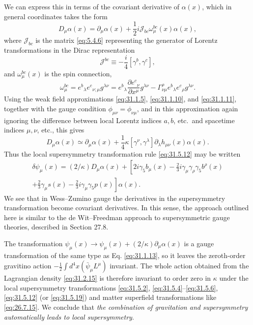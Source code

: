 We can express this in terms of the covariant derivative of \(\alpha(x)\),
which in general coordinates takes the form
\begin{equation}
  D_\mu\alpha(x)
  =\partial_\mu\alpha(x)
   +\frac{1}{2}i\mathscr{J}_{bc}\omega_\mu^{bc}(x)\alpha(x),
  \tag{31.5.15}\label{eq:31.5.15}
\end{equation}
where \(\mathscr{J}_{bc}\) is the matrix \eqref{eq:5.4.6} representing
the generator of Lorentz transformations in the Dirac representation
\begin{equation}
  \mathscr{J}^{bc}
  \equiv-\frac{i}{4}[\gamma^b,\gamma^c],
  \tag{31.5.16}\label{eq:31.5.16}
\end{equation}
and \(\omega_\mu^{bc}(x)\) is the spin connection,
\begin{equation}
  \omega_\mu^{bc}
  =e^b{}_\lambda e^c{}_{\nu;\mu}g^{\lambda\nu}
  =e^b{}_\lambda\frac{\partial e^c{}_\nu}{\partial x^\mu}g^{\lambda\nu}
   -\Gamma^\rho_{\nu\mu}e^b{}_\lambda e^c{}_\rho g^{\lambda\nu}.
  \tag{31.5.17}\label{eq:31.5.17}
\end{equation}
Using the weak field approximations \eqref{eq:31.1.5},
\eqref{eq:31.1.10}, and \eqref{eq:31.1.11}, together with the gauge
condition \(\phi_{\mu\nu}=\phi_{\nu\mu}\), and in this approximation
again ignoring the difference between local Lorentz indices \(a,b\),
etc.\ and spacetime indices \(\mu,\nu\), etc., this gives
\begin{equation}
  D_\mu\alpha(x)
  \simeq\partial_\mu\alpha(x)
  +\frac{1}{4}\kappa[\gamma^\nu,\gamma^\lambda]
    \partial_\lambda h_{\mu\nu}(x)\alpha(x).
  \tag{31.5.18}\label{eq:31.5.18}
\end{equation}
Thus the local supersymmetry transformation rule \eqref{eq:31.5.12} may
be written
\begin{multline}
  \delta\psi_\mu(x)
  =(2/\kappa)D_\mu\alpha(x)
  +\left[
      2i\gamma_5b_\mu(x)
      -\frac{2}{3}i\gamma_\mu\gamma_\rho\gamma_5b^\rho(x)\right.\\
  \left.
      +\frac{2}{3}\gamma_\mu s(x)
      -\frac{2}{3}i\gamma_\mu\gamma_5p(x)
    \right]\alpha(x).
  \tag{31.5.19}\label{eq:31.5.19}
\end{multline}
We see that in Wess--Zumino gauge the derivatives in the supersymmetry
transformation become covariant derivatives. In this sense, the
approach outlined here is similar to the de Wit--Freedman approach to
supersymmetric gauge theories, described in Section 27.8.

The transformation
\(\psi_\mu(x)\longrightarrow\psi_\mu(x)+(2/\kappa)\partial_\mu\alpha(x)\)
is a gauge transformation of the same type as Eq. \eqref{eq:31.1.13},
so it leaves the zeroth-order gravitino action
\(-\frac{1}{2}\int d^4x(\bar\psi_\mu L^\mu)\) invariant. The whole action
obtained from the Lagrangian density \eqref{eq:31.2.15} is therefore
invariant to order zero in \(\kappa\) under the local supersymmetry
transformations \eqref{eq:31.5.2}, \eqref{eq:31.5.4}--\eqref{eq:31.5.6},
\eqref{eq:31.5.12} (or \eqref{eq:31.5.19}) and matter superfield
transformations like \eqref{eq:26.7.15}. We conclude that
\emph{the combination of gravitation and supersymmetry automatically
leads to local supersymmetry}.
